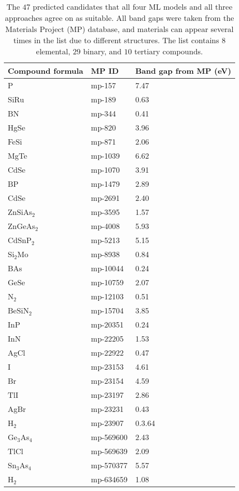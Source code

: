 \begin{center}
\begin{longtable}{M{3.5cm} M{6.5cm} M{2.0cm}}
\caption{The $47$ predicted candidates that all four ML models and all three approaches agree on as suitable. All band gaps were taken from the Materials Project (MP) database, and materials can appear several times in the list due to different structures. The list contains $8$ elemental, $29$ binary, and $10$ tertiary compounds.}
\label{tab:04-probability-candidates}  
\\ \hline
Compound formula & MP ID & Band gap from MP (eV) \\
\hline
  P & mp-157 & 7.47\\
  SiRu & mp-189 & 0.63\\
  BN & mp-344 & 0.41\\
  HgSe & mp-820 & 3.96\\
  FeSi & mp-871 & 2.06\\
  MgTe & mp-1039 & 6.62\\
  CdSe & mp-1070 & 3.91\\
  BP & mp-1479 & 2.89\\
  CdSe & mp-2691 & 2.40\\
  ZnSiAs$_2$ & mp-3595 & 1.57\\
  ZnGeAs$_2$ & mp-4008 & 5.93\\
  CdSnP$_2$ & mp-5213 & 5.15\\
  Si$_2$Mo & mp-8938 & 0.84\\
  BAs & mp-10044 & 0.24\\
  GeSe & mp-10759 & 2.07\\
  N$_2$ & mp-12103 & 0.51\\
  BeSiN$_2$ & mp-15704 & 3.85\\
  InP & mp-20351 & 0.24\\
  InN & mp-22205 & 1.53\\
  AgCl & mp-22922 & 0.47\\
  I & mp-23153 & 4.61\\
  Br & mp-23154 & 4.59\\
  TlI & mp-23197 & 2.86\\
  AgBr & mp-23231 & 0.43\\
  H$_2$ & mp-23907 & 0.3.64\\
  Ge$_3$As$_4$ & mp-569600 & 2.43\\
  TlCl & mp-569639 & 2.09\\
  Sn$_3$As$_4$ & mp-570377 & 5.57\\
  H$_2$ & mp-634659 & 1.08\\

\end{longtable}
\end{center}
